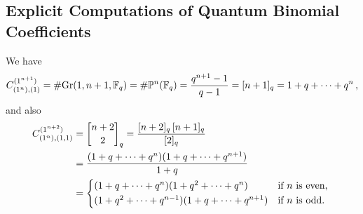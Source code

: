 \documentclass[a4paper,11pt]{scrartcl}
\begin{document}
\subsection{Explicit Computations of Quantum Binomial Coefficients}
\label{examples of quantum binomial coefficients}

We have
\[
  C^{(1^{n+1})}_{(1^n),(1)}
  =
  \# {\operatorname{Gr}(1, n+1, \mathbb{F}_q)}
  = 
  \# {\mathbb{P}^n(\mathbb{F}_q)}
  =
  \frac{ q^{n+1} - 1 }{ q - 1 }
  =
  [n+1]_q
  =
  1 + q + \dotsb + q^n \,,
\]
and also
\begin{align*}
  C^{(1^{n+2})}_{(1^n),(1,1)}
  &=
  \qbinom{n+2}{2}_q
  =
  \frac{[n+2]_q \, [n+1]_q}{[2]_q}
  \\
  &=
  \frac{ (1 + q + \dotsb + q^n) (1 + q + \dotsb + q^{n+1}) }{ 1 + q }
  \\
  &=
  \begin{cases*}
    (1 + q + \dotsb + q^n) (1 + q^2 + \dotsb + q^n)
    &
    if~$n$ is even,
    \\
    (1 + q^2 + \dotsb + q^{n-1}) (1 + q + \dotsb + q^{n+1})
    &
    if~$n$ is odd.
  \end{cases*}
\end{align*}
\end{document}
